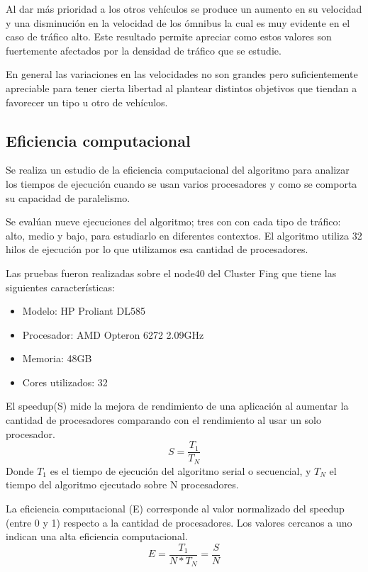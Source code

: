 Al dar más prioridad a los otros vehículos se produce un aumento en su velocidad y una disminución en la velocidad de los ómnibus la cual es muy evidente en el caso de tráfico alto. Este resultado permite apreciar como estos valores son fuertemente afectados por la densidad de tráfico que se estudie.

En general las variaciones en las velocidades no son grandes pero suficientemente apreciable para tener cierta libertad al plantear distintos objetivos que tiendan a favorecer un tipo u otro de vehículos.


\subsection{Eficiencia computacional}

Se realiza un estudio de la eficiencia computacional del algoritmo para analizar los tiempos de ejecución cuando se usan varios procesadores y como se comporta su capacidad de paralelismo.

Se evalúan nueve ejecuciones del algoritmo; tres con con cada tipo de tráfico: alto, medio y bajo, para estudiarlo en diferentes contextos. El algoritmo utiliza 32 hilos de ejecución por lo que utilizamos esa cantidad de procesadores.

Las pruebas fueron realizadas sobre el node40 del Cluster Fing que tiene las siguientes características:

\begin{itemize}
	\item Modelo: HP Proliant DL585
	\item Procesador: AMD Opteron 6272 2.09GHz
	\item Memoria: 48GB
	\item Cores utilizados: 32
\end{itemize}





El speedup(S) mide la mejora de rendimiento de una aplicación al aumentar la cantidad de procesadores comparando con el rendimiento al usar un solo procesador.
\begin{equation}
\label{eq:funcion_speedup}
S = \frac{T_1}{T_N}
\end{equation}
Donde ${T_1}$ es el tiempo de ejecución del algoritmo serial o secuencial, y ${T_N}$ el tiempo del algoritmo ejecutado sobre N procesadores.
\newline

La eficiencia computacional (E) corresponde al valor normalizado del speedup (entre 0 y 1) respecto a la cantidad de procesadores. Los valores cercanos a uno indican una alta eficiencia computacional.
\begin{equation}
\label{eq:funcion_eficiencia}
E = \frac{T_1}{N*T_N} = \frac{S}{N}
\end{equation}



